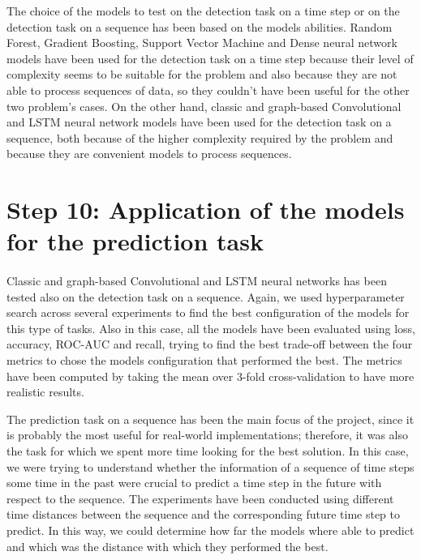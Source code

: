 The choice of the models to test on the detection task on a time step or on the detection task on a sequence has been based on the models abilities. Random Forest, Gradient Boosting, Support Vector Machine and Dense neural network models have been used for the detection task on a time step because their level of complexity seems to be suitable for the problem and also because they are not able to process sequences of data, so they couldn't have been useful for the other two problem's cases. On the other hand, classic and graph-based Convolutional and LSTM neural network models have been used for the detection task on a sequence, both because of the higher complexity required by the problem and because they are convenient models to process sequences.


\section{Step 10: Application of the models for the prediction task} \label{sec: step_models_prediction_task}
\paragraph{} Classic and graph-based Convolutional and LSTM neural networks has been tested also on the detection task on a sequence. Again, we used hyperparameter search across several experiments to find the best configuration of the models for this type of tasks. Also in this case, all the models have been evaluated using loss, accuracy, ROC-AUC and recall, trying to find the best trade-off between the four metrics to chose the models configuration that performed the best. The metrics have been computed by taking the mean over 3-fold cross-validation to have more realistic results.

The prediction task on a sequence has been the main focus of the project, since it is probably the most useful for real-world implementations; therefore, it was also the task for which we spent more time looking for the best solution. In this case, we were trying to understand whether the information of a sequence of time steps some time in the past were crucial to predict a time step in the future with respect to the sequence. The experiments have been conducted using different time distances between the sequence and the corresponding future time step to predict. In this way, we could determine how far the models where able to predict and which was the distance with which they performed the best.

